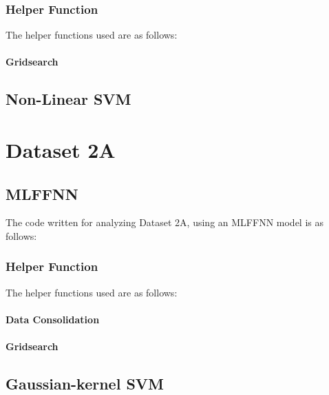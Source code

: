\documentclass[11pt,a4paper]{article}
\begin{document}
\subsubsection{Helper Function}
The helper functions used are as follows:\vspace{-1em}
\paragraph{Gridsearch}
\vspace{-1.5em}


\subsection{Non-Linear SVM}

\section{Dataset 2A}
\subsection{MLFFNN}
The code written for analyzing Dataset 2A, using an MLFFNN model is as follows:\vspace{-1em}


\subsubsection{Helper Function}
The helper functions used are as follows:\vspace{-1em}
\paragraph{Data Consolidation}
\vspace{-1.5em}

\paragraph{Gridsearch}
\vspace{-1.5em}



\subsection{Gaussian-kernel SVM}
\end{document}
